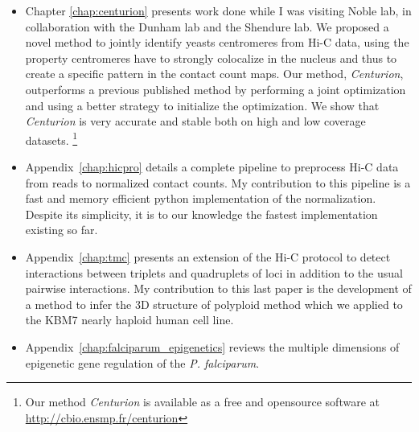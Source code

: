 \begin{itemize}
\item Chapter \ref{chap:centurion} presents work done while I was visiting
Noble lab, in collaboration with the Dunham lab and the Shendure lab. We proposed a
novel method to jointly identify yeasts centromeres from Hi-C data, using the
property centromeres have to strongly colocalize in the nucleus and thus to
create a specific pattern in the contact count maps. Our method,
\textit{Centurion}, outperforms a previous published method by performing a
joint optimization and using a better strategy to initialize the optimization.
We show that \textit{Centurion} is very accurate and stable both on high and
low coverage datasets. \footnote{Our method \textit{Centurion} is available as
a free and opensource software at \url{http://cbio.ensmp.fr/centurion}}

\item Appendix~\ref{chap:hicpro} details a complete pipeline to preprocess
Hi-C data from reads to normalized contact counts. My contribution to this
pipeline is a fast and memory efficient python implementation of the
normalization. Despite its simplicity, it is to our knowledge the fastest
implementation existing so far.

\item Appendix~\ref{chap:tmc} presents an extension of  the Hi-C protocol to
detect interactions between triplets and quadruplets of loci in addition to
the usual pairwise interactions. My contribution to this last paper is the
development of a method to infer the 3D structure of polyploid method which we
applied to the KBM7 nearly haploid human cell line.

\item Appendix~\ref{chap:falciparum_epigenetics} reviews the multiple
dimensions of epigenetic gene regulation of the {\em P. falciparum}.

\end{itemize}
